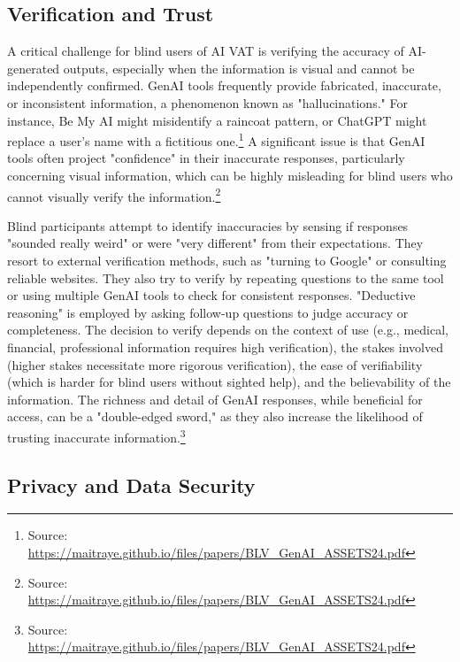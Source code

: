 \subsection{Verification and Trust}

A critical challenge for blind users of AI VAT is verifying the accuracy of AI-generated outputs, especially when the information is visual and cannot be independently confirmed. GenAI tools frequently provide fabricated, inaccurate, or inconsistent information, a phenomenon known as "hallucinations." For instance, Be My AI might misidentify a raincoat pattern, or ChatGPT might replace a user's name with a fictitious one.\footnote{Source: \url{https://maitraye.github.io/files/papers/BLV_GenAI_ASSETS24.pdf}} A significant issue is that GenAI tools often project "confidence" in their inaccurate responses, particularly concerning visual information, which can be highly misleading for blind users who cannot visually verify the information.\footnote{Source: \url{https://maitraye.github.io/files/papers/BLV_GenAI_ASSETS24.pdf}}

Blind participants attempt to identify inaccuracies by sensing if responses "sounded really weird" or were "very different" from their expectations. They resort to external verification methods, such as "turning to Google" or consulting reliable websites. They also try to verify by repeating questions to the same tool or using multiple GenAI tools to check for consistent responses. "Deductive reasoning" is employed by asking follow-up questions to judge accuracy or completeness. The decision to verify depends on the context of use (e.g., medical, financial, professional information requires high verification), the stakes involved (higher stakes necessitate more rigorous verification), the ease of verifiability (which is harder for blind users without sighted help), and the believability of the information. The richness and detail of GenAI responses, while beneficial for access, can be a "double-edged sword," as they also increase the likelihood of trusting inaccurate information.\footnote{Source: \url{https://maitraye.github.io/files/papers/BLV_GenAI_ASSETS24.pdf}}

\subsection{Privacy and Data Security}

